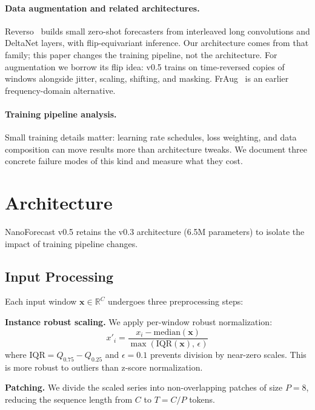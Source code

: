 \documentclass[11pt]{article}
\begin{document}
\paragraph{Data augmentation and related architectures.}
Reverso~\cite{reverso} builds small zero-shot forecasters from interleaved long convolutions and DeltaNet layers, with flip-equivariant inference. Our architecture comes from that family; this paper changes the training pipeline, not the architecture. For augmentation we borrow its flip idea: v0.5 trains on time-reversed copies of windows alongside jitter, scaling, shifting, and masking. FrAug~\cite{freqmix} is an earlier frequency-domain alternative.

\paragraph{Training pipeline analysis.}
Small training details matter: learning rate schedules, loss weighting, and data composition can move results more than architecture tweaks. We document three concrete failure modes of this kind and measure what they cost.

\section{Architecture}
\label{sec:architecture}

NanoForecast v0.5 retains the v0.3 architecture (6.5M parameters) to isolate the impact of training pipeline changes.

\subsection{Input Processing}
\label{sec:input}

Each input window $\mathbf{x} \in \mathbb{R}^C$ undergoes three preprocessing steps:

\textbf{Instance robust scaling.} We apply per-window robust normalization:
\begin{equation}
x'_i = \frac{x_i - \text{median}(\mathbf{x})}{\max(\text{IQR}(\mathbf{x}),\, \epsilon)}
\label{eq:scaling}
\end{equation}
where $\text{IQR} = Q_{0.75} - Q_{0.25}$ and $\epsilon = 0.1$ prevents division by near-zero scales. This is more robust to outliers than z-score normalization.

\textbf{Patching.} We divide the scaled series into non-overlapping patches of size $P=8$, reducing the sequence length from $C$ to $T = C / P$ tokens.
\end{document}
